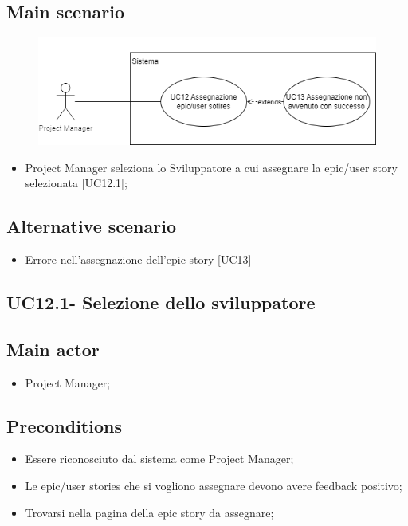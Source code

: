 \documentclass{article}
\begin{document}
    \subsection*{Main scenario}
        \begin{figure}[h]
          \centering
          \includegraphics{documenti/imgUML/UC12-zoom.png}
          \label{fig:immagine}
        \end{figure}
        
        \begin{itemize}
            \item Project Manager seleziona lo Sviluppatore a cui assegnare la epic/user story selezionata [UC12.1];
        \end{itemize}
        
    \subsection*{Alternative scenario}
        \begin{itemize}
            \item Errore nell'assegnazione dell'epic story [UC13]
        \end{itemize}    
        
    \subsection{UC12.1- Selezione dello sviluppatore}
        \subsection*{Main actor}
    \begin{itemize}
        \item Project Manager;
    \end{itemize}
    
    \subsection*{Preconditions}
        \begin{itemize}
            \item Essere riconosciuto dal sistema come Project Manager;
            \item Le epic/user stories che si vogliono assegnare devono avere feedback positivo;
            \item Trovarsi nella pagina della epic story da assegnare;
        \end{itemize}
        
\end{document}
